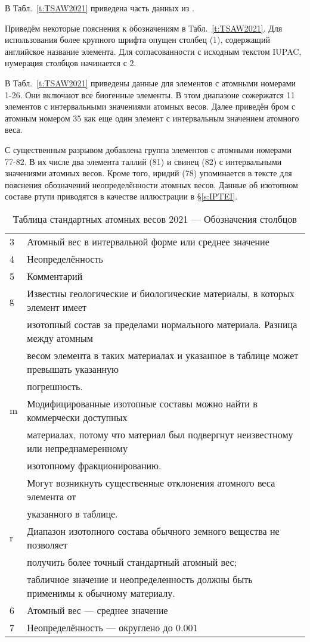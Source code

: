 \documentclass[a5paper,openany]{book}
\begin{document}
В Табл.~\ref{t:TSAW2021} приведена часть данных из \cite{IUPAC2021}.

Приведём некоторые пояснения к обозначениям в Табл.~\ref{t:TSAW2021}. Для использования более крупного шрифта опущен столбец (1), содержащий английское название элемента. Для согласованности с исходным текстом IUPAC, нумерация столбцов начинается с 2. 


В Табл.~\ref{t:TSAW2021} приведены данные для элементов с атомными номерами 1-26. Они включают все биогенные элементы. В этом диапазоне сожержатся 11 элементов с интервальными значениями атомных весов.
Далее приведён бром с атомным номером 35 как еще один элемент с интервальным значением атомного веса.

С существенным разрывом добавлена группа элементов  с атомными номерами 77-82. В их числе два элемента таллий (81) и свинец (82) с интервальными значениями атомных весов. Кроме того, иридий (78) упоминается в тексте для пояснения обозначений неопределённости атомных весов. Данные об изотопном составе ртути приводятся в качестве иллюстрации в \S\ref{s:IPTEI}. 

\begin{table}[h!]
	{\scriptsize 
		\begin{tabular}{ll}
			3 & Атомный вес в интервальной форме или среднее значение \\
			4 & Неопределённость \\	
			5 & Комментарий \\
			g & Известны геологические и биологические материалы, в которых элемент имеет  \\
			~ & изотопный состав за пределами нормального материала. Разница между атомным  \\
			~ & весом элемента в таких материалах и указанное в таблице может превышать указанную  \\
			~ & погрешность.\\
			m & Модифицированные изотопные составы можно найти в коммерчески доступных  \\
			~ & материалах, потому что материал был подвергнут неизвестному или непреднамеренному \\
			~ & изотопному фракционированию. \\ 
			~ & Могут возникнуть существенные отклонения атомного веса элемента от \\
			~ & указанного в таблице. \\
			r & Диапазон изотопного состава обычного земного вещества не позволяет \\
			~ & получить более точный  стандартный атомный вес; \\
			~ & табличное значение и неопределенность должны быть применимы к обычному материалу.\\
			6 & Атомный вес --- среднее значение \\
			7 & Неопределённость --- округлено до $0.001$
		\end{tabular}
	}
	\caption{Таблица стандартных атомных весов 2021 --- Обозначения столбцов}
	\label{t:TSAW2021Notes}
\end{table}
\end{document}
